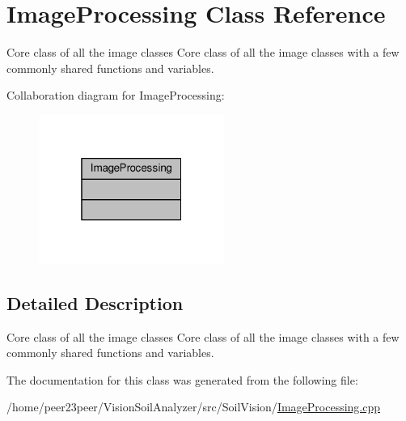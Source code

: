 \hypertarget{class_image_processing}{}\section{Image\+Processing Class Reference}
\label{class_image_processing}


Core class of all the image classes Core class of all the image classes with a few commonly shared functions and variables.  




Collaboration diagram for Image\+Processing\+:\nopagebreak
\begin{figure}[H]
\begin{center}
\leavevmode
\includegraphics[width=172pt]{class_image_processing__coll__graph}
\end{center}
\end{figure}


\subsection{Detailed Description}
Core class of all the image classes Core class of all the image classes with a few commonly shared functions and variables. 

The documentation for this class was generated from the following file\+:\begin{DoxyCompactItemize}
\item 
/home/peer23peer/\+Vision\+Soil\+Analyzer/src/\+Soil\+Vision/\hyperlink{_image_processing_8cpp}{Image\+Processing.\+cpp}\end{DoxyCompactItemize}
